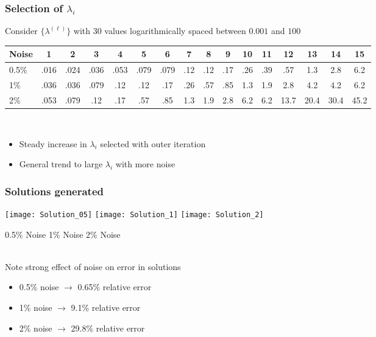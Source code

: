 \documentclass[12pt,t,xcolor=dvipsnames]{beamer}
\newcommand{\alerta}[1]{{\usebeamercolor[fg]{frametitle} #1}}
\begin{document}
\begin{frame}
  \frametitle{Selection of $\lambda_i$}

  Consider $\{\lambda^{(\ell)}\}$ with 30 values logarithmically spaced between
  $0.001$ and $100$ \\[12pt]

  \hspace*{-1cm}
  \setlength\tabcolsep{1.5pt}
  \begin{tabular}{l|ccccc|ccccc|ccccc}
    Noise & 1 & 2 & 3 & 4 & 5 & 6 & 7 & 8 & 9 & 10 & 11 & 12 & 13 & 14
    & 15 \\
    \hline
    0.5\% & .016 &  .024 &  .036 &  .053 &  .079 &    .079 &    .12 &
    .12 &    .17 &    .26 &    .39 & .57 &    \alerta{1.3} &    \alerta{2.8} &    \alerta{6.2}\\
    1\% & .036 &   .036  &  .079 &   .12 &    .12 &    .17 &
    .26 &    .57 &    \alerta{.85} &    \alerta{1.3} &    \alerta{1.9} & \alerta{2.8} &   \alerta{4.2} &
    \alerta{4.2} &    \alerta{6.2}\\
    2\% & .053 &    .079 &   .12 &   .17 &    .57 &    \alerta{.85} &    \alerta{1.3} &
    \alerta{1.9} &    \alerta{2.8} &    \alerta{6.2} &    \alerta{6.2} & \alerta{13.7} &  \alerta{20.4} &   \alert{30.4} &   \alert{45.2}\\
   \end{tabular}

  \ \\[12pt]
  \begin{itemize}
  \item Steady increase in $\lambda_i$ selected with outer iteration
  \item General trend to large $\lambda_i$ with more noise
  \end{itemize}

\end{frame}


\begin{frame}
\frametitle{Solutions generated}

\hspace*{-1cm}
  \texttt{[image: Solution\_05]}
  \texttt{[image: Solution\_1]}
  \texttt{[image: Solution\_2]}

0.5\% Noise \hfill 1\% Noise \hfill 2\% Noise

\ \\[12pt]
  Note strong effect of noise on error in solutions
  \begin{itemize}
    \item 0.5\% noise $\rightarrow$ 0.65\% relative error
    \item 1\% noise $\rightarrow$ 9.1\% relative error
    \item 2\% noise $\rightarrow$ 29.8\% relative error
  \end{itemize}
  

\end{frame}
\end{document}

